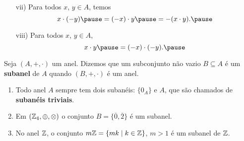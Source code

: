\documentclass{beamer}
\begin{document}
    \begin{frame}
        \begin{proposicao}
            \begin{enumerate}
                \item[vii)] Para todos $x$, \pause $y \in A$, \pause temos\pause
                \[
                    x \cdot (-y) \pause = (-x) \cdot y \pause = -(x \cdot y).\pause
                \]

                \vspace{.5cm}

                \item[viii)] Para todos $x$, \pause $y \in A$, \pause
                \[
                    x \cdot y \pause = (-x) \cdot (-y).\pause
                \]

                \vspace{.5cm}
            \end{enumerate}
        \end{proposicao}
    \end{frame}

    \begin{frame}
        \begin{definicao}
            Seja $(A, +, \cdot)$ um anel. \pause Dizemos que um subconjunto não vazio \pause $B\subseteq A$ \pause é um \textbf{subanel} de $A$ \pause quando $(B, +, \cdot)$ é um anel.\pause
        \end{definicao}

        \begin{exemplos}
            \begin{enumerate}[label={\arabic*})]
                \item Todo anel $A$ sempre tem dois subanéis: \pause $\{0_{A}\}$ \pause e $A$, \pause que são chamados de \textbf{subanéis triviais}.\pause

                \vspace{.5cm}

                \item Em $(\mathbb{Z}_4,\oplus,\otimes)$ \pause o conjunto $B = \{\overline{0}, \overline{2}\}$ é um subanel.\pause

                \vspace{.5cm}

                \item No anel $\mathbb{Z}$, \pause o conjunto $m\mathbb{Z} = \{mk \mid k \in \mathbb{Z}\}$, $m > 1$ \pause é um subanel de $\mathbb{Z}$.\pause

                \vspace{.5cm}
            \end{enumerate}
        \end{exemplos}
    \end{frame}
\end{document}
